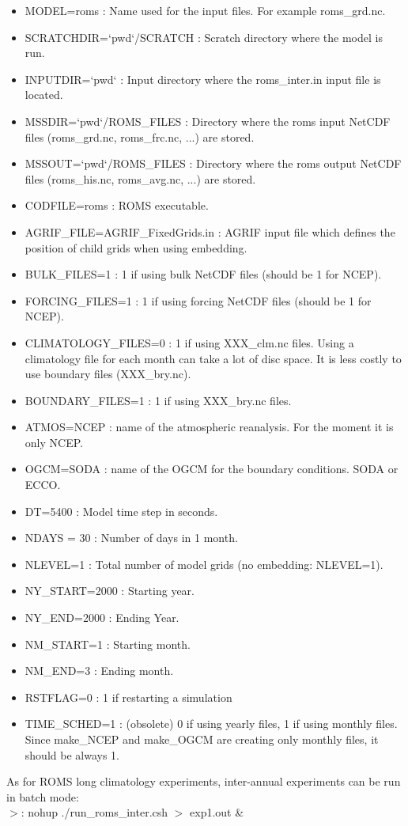 \begin{itemize}
\item MODEL=roms : Name used for the input files. For example roms\_grd.nc.
\item SCRATCHDIR=`pwd`/SCRATCH : Scratch directory where the model is run.
\item INPUTDIR=`pwd` : Input directory where the roms\_inter.in input file
is located.
\item MSSDIR=`pwd`/ROMS\_FILES : Directory where the roms input NetCDF files
(roms\_grd.nc, roms\_frc.nc, ...) are stored.
\item MSSOUT=`pwd`/ROMS\_FILES : Directory where the roms output NetCDF files
(roms\_his.nc, roms\_avg.nc, ...) are stored.
\item CODFILE=roms : ROMS executable.
\item AGRIF\_FILE=AGRIF\_FixedGrids.in : AGRIF input file which defines the 
position of child grids when using embedding.
\item BULK\_FILES=1 : 1 if using bulk NetCDF files (should be 1 for NCEP).
\item FORCING\_FILES=1 : 1 if using forcing NetCDF files (should be 1 for NCEP).
\item CLIMATOLOGY\_FILES=0 : 1 if using XXX\_clm.nc files. Using a climatology
file for each month can take a lot of disc space. It is less costly to use
 boundary files (XXX\_bry.nc). 
\item BOUNDARY\_FILES=1 : 1 if using XXX\_bry.nc files. 
\item ATMOS=NCEP : name of the atmospheric reanalysis. For the moment it is only
NCEP.
\item OGCM=SODA : name of the OGCM for the boundary conditions. SODA or ECCO.
\item DT=5400 : Model time step in seconds.
\item NDAYS = 30 : Number of days in 1 month.
\item NLEVEL=1 : Total number of model grids (no embedding: NLEVEL=1).
\item NY\_START=2000 : Starting year.
\item NY\_END=2000 : Ending Year.
\item NM\_START=1 : Starting month.
\item NM\_END=3 : Ending month.
\item RSTFLAG=0 : 1 if restarting a simulation
\item TIME\_SCHED=1 : (obsolete) 0 if using yearly files, 1 if using monthly 
files. Since make\_NCEP and make\_OGCM are creating only monthly
files, it should be always 1.
\end{itemize}


As for ROMS long climatology experiments, inter-annual experiments can be run
in batch mode:\\
$>$: nohup ./run\_roms\_inter.csh $>$ exp1.out \&\\\\
